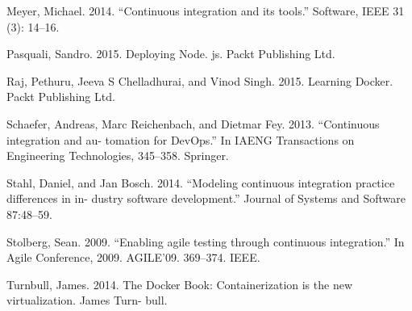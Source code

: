 Meyer, Michael. 2014. “Continuous integration and its tools.” Software, IEEE 31 (3): 14–16.

Pasquali, Sandro. 2015. Deploying Node. js. Packt Publishing Ltd.

Raj, Pethuru, Jeeva S Chelladhurai, and Vinod Singh. 2015. Learning Docker. Packt Publishing Ltd.

Schaefer, Andreas, Marc Reichenbach, and Dietmar Fey. 2013. “Continuous integration and au- tomation for DevOps.” In IAENG Transactions on Engineering Technologies, 345–358. Springer.

Stahl, Daniel, and Jan Bosch. 2014. “Modeling continuous integration practice differences in in- dustry software development.” Journal of Systems and Software 87:48–59.

Stolberg, Sean. 2009. “Enabling agile testing through continuous integration.” In Agile Conference, 2009. AGILE’09. 369–374. IEEE.

Turnbull, James. 2014. The Docker Book: Containerization is the new virtualization. James Turn- bull.



\newpage
